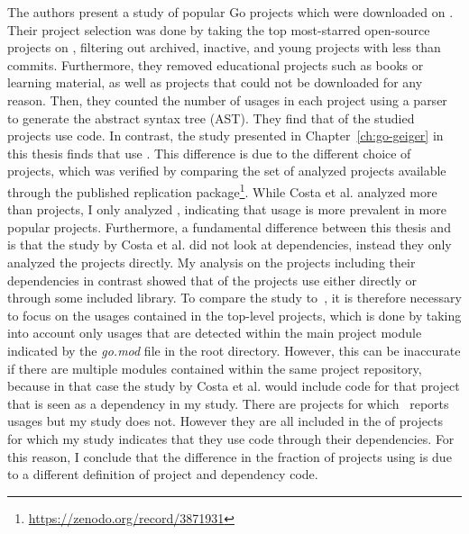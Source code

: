 The authors present a study of  popular Go projects which were downloaded on
.
Their project selection was done by taking the top  most-starred open-source projects on \github{},
filtering out archived, inactive, and young projects with less than  commits.
Furthermore, they removed educational projects such as books or learning material, as well as projects that could not be
downloaded for any reason.
Then, they counted the number of \unsafe{} usages in each project using a parser to generate the abstract syntax tree
(\acrshort{AST}).
They find that  of the studied projects use \unsafe{} code.
In contrast, the study presented in Chapter~\ref{ch:go-geiger} in this thesis finds that \percentageUnsafeProjects{}
use \unsafe{}.
This difference is due to the different choice of projects, which was verified by comparing the set of analyzed projects
available through the published replication package\footnote{\url{https://zenodo.org/record/3871931}}.
While Costa et al. analyzed more than  projects, I only analyzed \projsAnalyzed{}, indicating that
\unsafe{} usage is more prevalent in more popular projects.
Furthermore, a fundamental difference between this thesis and~\cite{costa2020} is that the study by Costa et al. did not
look at dependencies, instead they only analyzed the projects directly.
My analysis on the projects including their dependencies in contrast showed that
\percentageUnsafeTransitiveWithDependencies{} of the projects use \unsafe{} either directly or through some included
library.
To compare the study to~\cite{costa2020}, it is therefore necessary to focus on the \unsafe{} usages contained in the
top-level projects, which is done by taking into account only usages that are detected within the main project module
indicated by the \textit{go.mod} file in the root directory.
However, this can be inaccurate if there are multiple modules contained within the same project repository, because in
that case the study by Costa et al. would include code for that project that is seen as a dependency in my study.
There are  projects for which~\cite{costa2020} reports \unsafe{} usages  but my study does not.
However they are all included in the \percentageUnsafeTransitiveWithDependencies{} of projects for which my study
indicates that they use \unsafe{} code through their dependencies.
For this reason, I conclude that the difference in the fraction of projects using \unsafe{} is due to a different
definition of project and dependency code.


